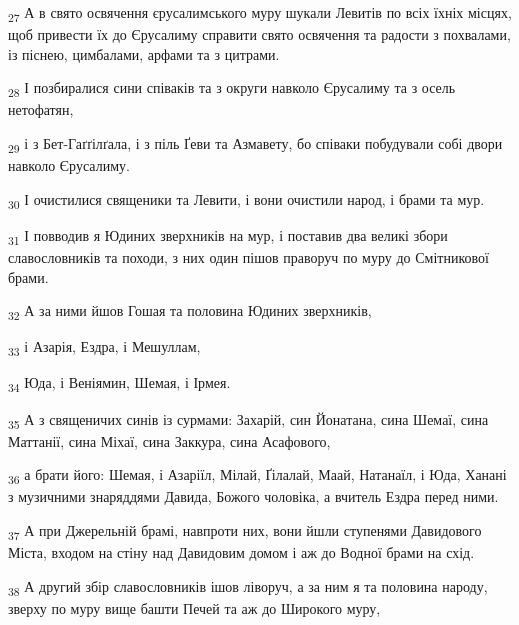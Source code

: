 \begin{tcolorbox}
\textsubscript{27} А в свято освячення єрусалимського муру шукали Левитів по всіх їхніх місцях, щоб привести їх до Єрусалиму справити свято освячення та радости з похвалами, із піснею, цимбалами, арфами та з цитрами.
\end{tcolorbox}
\begin{tcolorbox}
\textsubscript{28} І позбиралися сини співаків та з округи навколо Єрусалиму та з осель нетофатян,
\end{tcolorbox}
\begin{tcolorbox}
\textsubscript{29} і з Бет-Гаґґілґала, і з піль Ґеви та Азмавету, бо співаки побудували собі двори навколо Єрусалиму.
\end{tcolorbox}
\begin{tcolorbox}
\textsubscript{30} І очистилися священики та Левити, і вони очистили народ, і брами та мур.
\end{tcolorbox}
\begin{tcolorbox}
\textsubscript{31} І повводив я Юдиних зверхників на мур, і поставив два великі збори славословників та походи, з них один пішов праворуч по муру до Смітникової брами.
\end{tcolorbox}
\begin{tcolorbox}
\textsubscript{32} А за ними йшов Гошая та половина Юдиних зверхників,
\end{tcolorbox}
\begin{tcolorbox}
\textsubscript{33} і Азарія, Ездра, і Мешуллам,
\end{tcolorbox}
\begin{tcolorbox}
\textsubscript{34} Юда, і Веніямин, Шемая, і Ірмея.
\end{tcolorbox}
\begin{tcolorbox}
\textsubscript{35} А з священичих синів із сурмами: Захарій, син Йонатана, сина Шемаї, сина Маттанії, сина Міхаї, сина Заккура, сина Асафового,
\end{tcolorbox}
\begin{tcolorbox}
\textsubscript{36} а брати його: Шемая, і Азаріїл, Мілай, Ґілалай, Маай, Натанаїл, і Юда, Ханані з музичними знаряддями Давида, Божого чоловіка, а вчитель Ездра перед ними.
\end{tcolorbox}
\begin{tcolorbox}
\textsubscript{37} А при Джерельній брамі, навпроти них, вони йшли ступенями Давидового Міста, входом на стіну над Давидовим домом і аж до Водної брами на схід.
\end{tcolorbox}
\begin{tcolorbox}
\textsubscript{38} А другий збір славословників ішов ліворуч, а за ним я та половина народу, зверху по муру вище башти Печей та аж до Широкого муру,
\end{tcolorbox}
